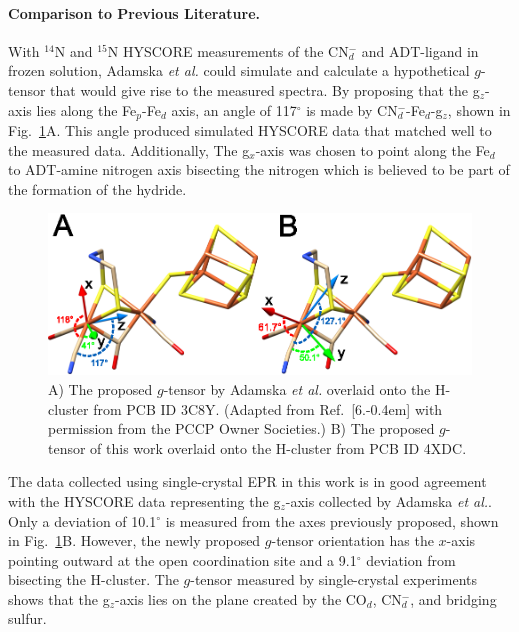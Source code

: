 \paragraph{Comparison to Previous Literature.} With $^{14}$N and $^{15}$N HYSCORE measurements of the CN$_d^-$ and ADT-ligand in frozen solution, Adamska \textit{et al.} could simulate and calculate a hypothetical $g$-tensor that would give rise to the measured spectra. \cite{Adamska2015} By proposing that the g$_z$-axis lies along the Fe$_p$-Fe$_d$ axis, an angle of 117$^\circ$ is made by CN$_d^-$-Fe$_d$-g$_z$, shown in Fig.~\ref{fig:gTensor}A. This angle produced simulated HYSCORE data that matched well to the measured data. Additionally, The g$_x$-axis was chosen to point along the Fe$_d$ to ADT-amine nitrogen axis bisecting the nitrogen which is believed to be part of the formation of the hydride.

\begin{figure}[ht]
\centering
\includegraphics{Kapitel/Appendix/Images/S6-gTensorCompare.eps}
\caption[Comparison of the proposed $g$-tensor.]{A) The proposed $g$-tensor by Adamska \textit{et al.} overlaid onto the H-cluster from PCB ID 3C8Y. (Adapted from Ref.~[6.\kern-0.4em] with permission from the PCCP Owner Societies.) B) The proposed $g$-tensor of this work overlaid onto the H-cluster from PCB ID 4XDC.}
\label{fig:gTensor}
\end{figure}

The data collected using single-crystal EPR in this work is in good agreement with the HYSCORE data representing the g$_z$-axis collected by Adamska \textit{et al.}. Only a deviation of 10.1$^{\circ}$ is measured from the axes previously proposed, shown in Fig.~\ref{fig:gTensor}B. However, the newly proposed $g$-tensor orientation has the $x$-axis pointing outward at the open coordination site and a 9.1$^{\circ}$ deviation from bisecting the H-cluster. The $g$-tensor measured by single-crystal experiments shows that the g$_z$-axis lies on the plane created by the CO$_d$, CN$_d^-$, and bridging sulfur. 

